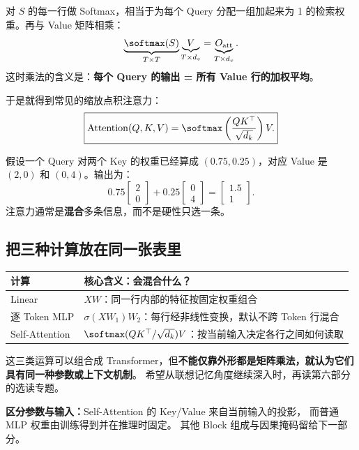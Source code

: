 对 $S$ 的每一行做 Softmax，相当于为每个 Query 分配一组加起来为 1 的检索权重。再与 Value 矩阵相乘：
\[
\underbrace{\softmax(S)}_{T\times T}
\underbrace{V}_{T\times d_v}
=
\underbrace{O_{\rm att}}_{T\times d_v}.
\]
这时乘法的含义是：\textbf{每个 Query 的输出 = 所有 Value 行的加权平均}。

于是就得到常见的缩放点积注意力：
\begin{equation}
\boxed{\operatorname{Attention}(Q,K,V)
=\softmax\left(\frac{QK^\top}{\sqrt{d_k}}\right)V.}
\end{equation}

\begin{example}[title={不是必须选出单独一条记忆}]
假设一个 Query 对两个 Key 的权重已经算成 $(0.75,0.25)$，对应 Value 是 $(2,0)$ 和 $(0,4)$。输出为：
\[
0.75\begin{bmatrix}2\\0\end{bmatrix}
+0.25\begin{bmatrix}0\\4\end{bmatrix}
=\begin{bmatrix}1.5\\1\end{bmatrix}.
\]
注意力通常是\textbf{混合}多条信息，而不是硬性只选一条。
\end{example}

\subsection{把三种计算放在同一张表里}

\begin{center}
\small
\renewcommand{\arraystretch}{1.3}
\begin{tabularx}{\linewidth}{@{}p{24mm}X@{}}
\toprule
计算 & 核心含义：会混合什么？\\
\midrule
Linear & $XW$：同一行内部的特征按固定权重组合\\
逐 Token MLP & $\sigma(XW_1)W_2$：每行经非线性变换，默认不跨 Token 行混合\\
Self-Attention & $\softmax(QK^\top/\sqrt{d_k})V$：按当前输入决定各行之间如何读取\\
\bottomrule
\end{tabularx}
\end{center}
这三类运算可以组合成 Transformer，但\textbf{不能仅靠外形都是矩阵乘法，就认为它们具有同一种参数或上下文机制}。
希望从联想记忆角度继续深入时，再读第六部分的选读专题。

\noindent\textbf{区分参数与输入：}Self-Attention 的 Key/Value 来自当前输入的投影，
而普通 MLP 权重由训练得到并在推理时固定。
其他 Block 组成与因果掩码留给下一部分。


